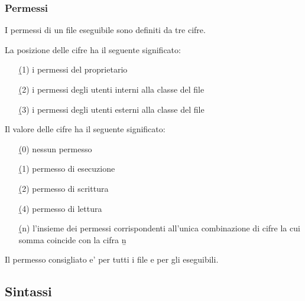 \skipline


\subsubsection{Permessi}

\bbox \; I permessi di un file eseguibile sono definiti da tre cifre.

\skipline

\bbox \; La posizione delle cifre ha il seguente significato:
\begin{itemize}
\item[\b{(1)}] i permessi del proprietario
\item[\b{(2)}] i permessi degli utenti interni alla classe del file
\item[\b{(3)}] i permessi degli utenti esterni alla classe del file
\end{itemize}

\skipline

\bbox \; Il valore delle cifre ha il seguente significato:
\begin{itemize}
\item[\b{(0)}] nessun permesso
\item[\b{(1)}] permesso di esecuzione
\item[\b{(2)}] permesso di scrittura
\item[\b{(4)}] permesso di lettura
\item[\b{(n)}] l'insieme dei permessi corrispondenti all'unica combinazione di cifre la cui somma coincide con la cifra \b{n}
\end{itemize}

\skipline

\bbox \; Il permesso consigliato e'  per tutti i file e  per gli eseguibili.

\subsection{Sintassi}


